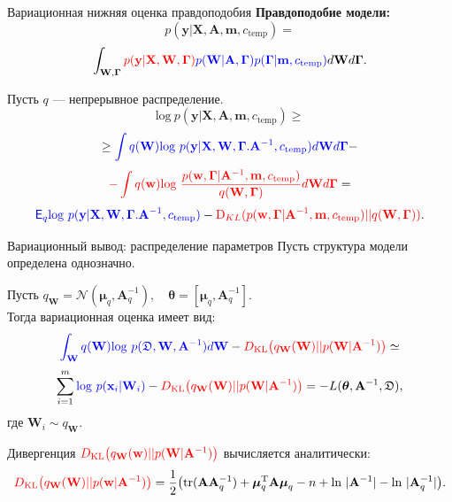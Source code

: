 \documentclass[usenames,dvipsnames,11pt,pdf,utf8,russian,aspectratio=169]{beamer}
\begin{document}
\begin{frame}{Вариационная нижняя оценка правдоподобия}     
\textbf{Правдоподобие модели:}
\[
p(\mathbf{y}|\mathbf{X},\mathbf{A},\mathbf{m}, c_{\text{temp}}) =
\]
\[
 \int_{\mathbf{W}, \boldsymbol{\Gamma} } \textcolor{red}{p(\mathbf{y}|\mathbf{X},\mathbf{W},  \boldsymbol{\Gamma})} \textcolor{blue}{p(\mathbf{W}|\mathbf{A}, \boldsymbol{\Gamma})p(\boldsymbol{\Gamma}|\mathbf{m}, c_{\text{temp}})} d\mathbf{W}d{\boldsymbol{\Gamma}}.                         
\]

Пусть $q$ --- непрерывное распределение.
$$                                                                                                                                              
        \text{log}~p(\mathbf{y}|\mathbf{X},\mathbf{A},\mathbf{m}, c_{\text{temp}}) \geq 
$$          
$$                                                                                                                                              
         \geq  \textcolor{blue}{\int q(\mathbf{W})\text{log}~{p(\mathbf{y} | \mathbf{X}, \mathbf{W}, \boldsymbol{\Gamma}. \mathbf{A}^{-1}, c_{\text{temp}})}d \mathbf{W}d\boldsymbol{\Gamma}} -$$ 
    $$  \textcolor{red}{-\int q(\mathbf{w})\text{log}~\frac{p(\mathbf{w}, \boldsymbol{\Gamma} |\mathbf{A}^{-1}, \mathbf{m}, c_{\text{temp}})}{q(\mathbf{W}, \boldsymbol{\Gamma})}d\mathbf{W}d\boldsymbol{\Gamma}} =$$
$$
\textcolor{blue}{\mathsf{E}_q \text{log}~{p(\mathbf{y} | \mathbf{X}, \mathbf{W}, \boldsymbol{\Gamma}. \mathbf{A}^{-1}, c_{\text{temp}})}} - \textcolor{red}{\text{D}_{KL}(p(\mathbf{w}, \boldsymbol{\Gamma} |\mathbf{A}^{-1}, \mathbf{m}, c_{\text{temp}}) || q(\mathbf{W}, \boldsymbol{\Gamma}))}.
$$ 

\end{frame}      
   

\begin{frame}{Вариационный вывод: распределение параметров}
Пусть структура модели определена однозначно.

Пусть $q_\mathbf{W} = \mathcal{N}(\boldsymbol{\mu}_q, \mathbf{A}^{-1}_q), \quad \boldsymbol{\theta} =  [\boldsymbol{\mu}_q, \mathbf{A}^{-1}_q].$ \\
Тогда вариационная оценка имеет вид:
$$
\textcolor{blue}{\int_{\mathbf{W}} q(\mathbf{W})\text{log}~{p(\mathfrak{D},\mathbf{W},\mathbf{A}^{-1})} d \mathbf{W}} - \textcolor{red}{D_\text{KL}\bigl(q_\mathbf{W} (\mathbf{W} )|| p (\mathbf{W}|\mathbf{A}^{-1})\bigr)} \simeq
$$
$$
\sum_{i=1}^m \textcolor{blue}{\text{log}~p(\mathbf{x}_i | \mathbf{W}_i)} - \textcolor{red}{D_\text{KL}\bigl(q_\mathbf{W} (\mathbf{W} )|| p (\mathbf{W}|\mathbf{A}^{-1})\bigr)} = -L(\boldsymbol{\theta}, \mathbf{A}^{-1}, \mathfrak{D}),
$$
где $\mathbf{W}_i \sim q_\mathbf{W}$.

Дивергенция $\textcolor{red}{D_\text{KL}\bigl(q_\mathbf{W} (\mathbf{w} )|| p (\mathbf{W}|\mathbf{A}^{-1})\bigr)}$ вычисляется аналитически:
$$
\textcolor{red}{D_\text{KL}\bigl(q_\mathbf{W} (\mathbf{W}) || p (\mathbf{w}|\mathbf{A}^{-1})\bigr)} = \frac{1}{2} \bigl( \text{tr} (\mathbf{A}\mathbf{A}^{-1}_q) + \boldsymbol{\mu}_q^\text{T}\mathbf{A}\boldsymbol{\mu}_q - n +\text{ln}~|\mathbf{A}^{-1}| - \text{ln}~|\mathbf{A}^{-1}_q| \bigr).
$$

\end{frame}
\end{document}
